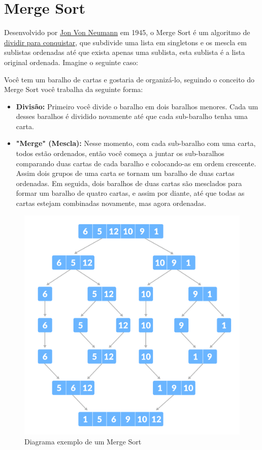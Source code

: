 \section{Merge Sort}
\label{sec:merge-sort-teo}

Desenvolvido por \href{https://en.wikipedia.org/wiki/John_von_Neumann}{Jon Von Neumann} em 1945, o Merge Sort é um algoritmo de \href{https://en.wikipedia.org/wiki/Divide-and-conquer_algorithm}{dividir para conquistar}, que subdivide uma lista em singletons e os mescla em sublistas ordenadas até que exista apenas uma sublista, esta sublista é a lista original ordenada. Imagine o seguinte caso:

Você tem um baralho de cartas e gostaria de organizá-lo, seguindo o conceito do Merge Sort você trabalha da seguinte forma:
\begin{itemize}
	\item \textbf{Divisão:} Primeiro você divide o baralho em dois baralhos menores. Cada um desses baralhos é dividido novamente até que cada sub-baralho tenha uma carta.
	\item \textbf{"Merge" (Mescla):} Nesse momento, com cada sub-baralho com uma carta, todos estão ordenados, então você começa a juntar os sub-baralhos comparando duas cartas de cada baralho e colocando-as em ordem crescente. Assim dois grupos de uma carta se tornam um baralho de duas cartas ordenadas. Em seguida, dois baralhos de duas cartas são mesclados para formar um baralho de quatro cartas, e assim por diante, até que todas as cartas estejam combinadas novamente, mas agora ordenadas.
\end{itemize}
\begin{figure}[!ht]
	\centering
	\includegraphics[scale=0.3]{figures/merge-sort-example_0.png}
	\caption{Diagrama exemplo de um Merge Sort}
	\label{fig:merge_sort_example_0}
\end{figure}

